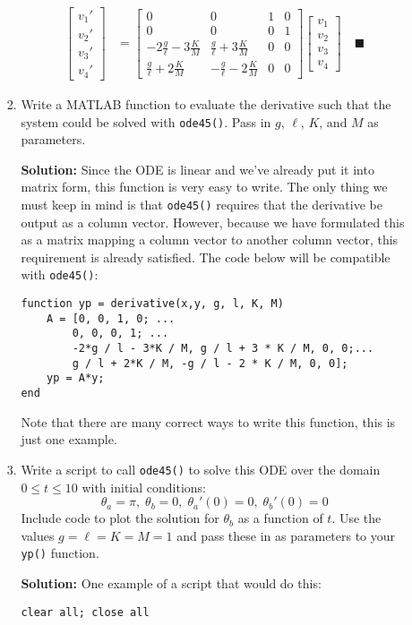 \documentclass[letterpaper, fontsize=10pt]{scrartcl} %
\numberwithin{equation}{section} %
\numberwithin{figure}{section} %
\numberwithin{table}{section} %
\begin{document}
\begin{enumerate}
\begin{enumerate}
\begin{enumerate}[label=(\roman*)]
\begin{align*}
\left[ \begin{array}{c} v_1' \\ v_2' \\ v_3' \\ v_4' \end{array} \right] &= \left[ \begin{array}{cccc} 0 & 0 & 1 & 0 \\ 0 & 0 & 0 & 1 \\ -2\frac{g}{\ell} - 3\frac{K}{M} & \frac{g}{\ell} + 3\frac{K}{M} & 0 & 0 \\ \frac{g}{\ell} + 2\frac{K}{M} & -\frac{g}{\ell} - 2\frac{K}{M} & 0 & 0 \end{array} \right] \left[ \begin{array}{c} v_1 \\ v_2 \\v_3 \\v_4 \end{array} \right] \quad\blacksquare 
\end{align*}


\item Write a MATLAB function to evaluate the derivative such that the system could be solved with \texttt{ode45()}. Pass in $g$, $\ell$, $K$, and $M$ as parameters.
\par \textbf{Solution:} Since the ODE is linear and we've already put it into matrix form, this function is very easy to write. The only thing we must keep in mind is that \texttt{ode45()} requires that the derivative be output as a column vector. However, because we have formulated this as a matrix mapping a column vector to another column vector, this requirement is already satisfied. The code below will be compatible with \texttt{ode45()}:

\begin{lstlisting}
function yp = derivative(x,y, g, l, K, M)
	A = [0, 0, 1, 0; ...
		0, 0, 0, 1; ...
		-2*g / l - 3*K / M, g / l + 3 * K / M, 0, 0;...
	 	g / l + 2*K / M, -g / l - 2 * K / M, 0, 0];
	yp = A*y;
end

\end{lstlisting}

Note that there are many correct ways to write this function, this is just one example. 

\item Write a script to call \texttt{ode45()} to solve this ODE over the domain $0 \leq t \leq 10$ with initial conditions:
\[ \theta_a = \pi, \; \theta_b = 0, \; \theta_a'(0) = 0, \; \theta_b'(0) = 0 \]
Include code to plot the solution for $\theta_b$ as a function of $t$. Use the values $g = \ell = K = M = 1$ and pass these in as parameters to your \texttt{yp()} function. 
\par \textbf{Solution:}
One example of a script that would do this:
\begin{lstlisting}
clear all; close all


\end{lstlisting}
\end{enumerate}
\end{enumerate}
\end{enumerate}
\end{document}
